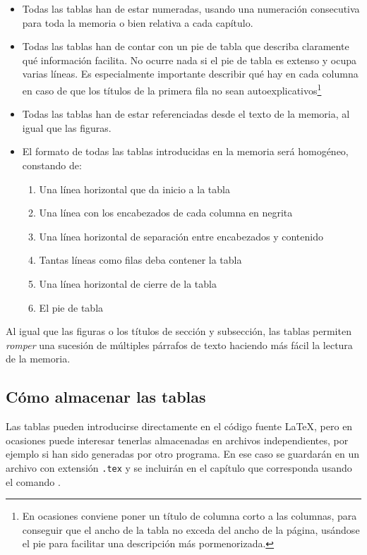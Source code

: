 \begin{itemize}
    \item Todas las tablas han de estar numeradas, usando una numeración consecutiva para toda la memoria o bien relativa a cada capítulo.

    \item Todas las tablas han de contar con un pie de tabla que describa claramente qué información facilita. No ocurre nada si el pie de tabla es extenso y ocupa varias líneas. Es especialmente importante describir qué hay en cada columna en caso de que los títulos de la primera fila no sean autoexplicativos\footnote{En ocasiones conviene poner un título de columna corto a las columnas, para conseguir que el ancho de la tabla no exceda del ancho de la página, usándose el pie para facilitar una descripción más pormenorizada.}

    \item Todas las tablas han de estar referenciadas desde el texto de la memoria, al igual que las figuras.

    \item El formato de todas las tablas introducidas en la memoria será homogéneo, constando de:
          \begin{enumerate}
              \item Una línea horizontal que da inicio a la tabla
              \item Una línea con los encabezados de cada columna en negrita
              \item Una línea horizontal de separación entre encabezados y contenido
              \item Tantas líneas como filas deba contener la tabla
              \item Una línea horizontal de cierre de la tabla
              \item El pie de tabla
          \end{enumerate}
\end{itemize}

Al igual que las figuras o los títulos de sección y subsección, las tablas permiten \textit{romper} una sucesión de múltiples párrafos de texto haciendo más fácil la lectura de la memoria.

\subsection{Cómo almacenar las tablas}

Las tablas pueden introducirse directamente en el código fuente \LaTeX, pero en ocasiones puede interesar tenerlas almacenadas en archivos independientes, por ejemplo si han sido generadas por otro programa. En ese caso se guardarán en un archivo con extensión \texttt{.tex} y se incluirán en el capítulo que corresponda usando el comando \verb||.

